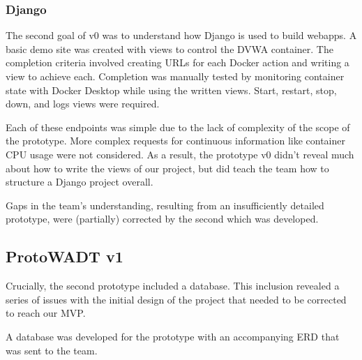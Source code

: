 \documentclass[../design-document.tex]{subfiles}
\begin{document}
\subsubsection{Django}
The second goal of v0 was to understand how Django is used to build webapps. A basic demo site was created with views to control the DVWA container. The completion criteria involved creating URLs for each Docker action and writing a view to achieve each. Completion was manually tested by monitoring container state with Docker Desktop while using the written views. Start, restart, stop, down, and logs views were required.

Each of these endpoints was simple due to the lack of complexity of the scope of the prototype. More complex requests for continuous information like container CPU usage were not considered. As a result, the prototype v0 didn't reveal much about how to write the views of our project, but did teach the team how to structure a Django project overall.

Gaps in the team's understanding, resulting from an insufficiently detailed prototype, were (partially) corrected by the second which was developed.

\subsection{ProtoWADT v1}
Crucially, the second prototype included a database. This inclusion revealed a series of issues with the initial design of the project that needed to be corrected to reach our MVP.

A database was developed for the prototype with an accompanying ERD that was sent to the team.

\begin{figure}[H]
	\centering
\end{figure}
\end{document}

